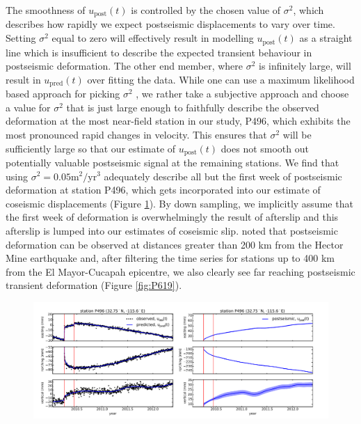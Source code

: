 \documentclass[review]{elsarticle}
\begin{document}
The smoothness of $u_\mathrm{post}(t)$ is controlled by the chosen value of $\sigma^2$, which describes how rapidly we expect postseismic displacements to vary over time.  Setting $\sigma^2$ equal to zero will effectively result in modelling $u_\mathrm{post}(t)$ as a straight line which is insufficient to describe the expected transient behaviour in postseismic deformation. The other end member, where $\sigma^2$ is infinitely large, will result in $u_\mathrm{pred}(t)$ over fitting the data. While one can use a maximum likelihood based approach for picking $\sigma^2$ \citep[e.g.][]{Segall1997}, we rather take a subjective approach and choose a value for $\sigma^2$ that is just large enough to faithfully describe the observed deformation at the most near-field station in our study, P496, which exhibits the most pronounced rapid changes in velocity. This ensures that $\sigma^2$ will be sufficiently large so that our estimate of $u_\mathrm{post}(t)$ does not smooth out potentially valuable postseismic signal at the remaining stations. We find that using $\sigma^2 = 0.05 \mathrm{m}^2 / \mathrm{yr}^3$ adequately describe all but the first week of postseismic deformation at station P496, which gets incorporated into our estimate of coseismic displacements (Figure \ref{fig:P496}). By down sampling, we implicitly assume that the first week of deformation is overwhelmingly the result of afterslip and this afterslip is lumped into our estimates of coseismic slip. \citet{Freed2007a} noted that postseismic deformation can be observed at distances greater than 200 km from the Hector Mine earthquake and, after filtering the time series for stations up to 400 km from the El Mayor-Cucapah epicentre, we also clearly see far reaching postseismic transient deformation (Figure \ref{fig:P619}).      

\begin{figure}
\includegraphics[scale=0.7]{Figures/FilterP496}
\centering
\caption{}
\label{fig:P496}
\end{figure}
\end{document}
